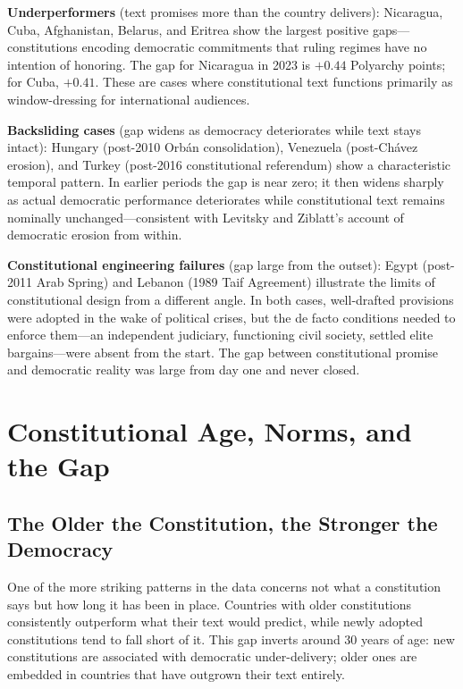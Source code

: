 \documentclass[9pt,twoside]{pnas-new}
\begin{document}
\textbf{Underperformers} (text promises more than the country delivers): Nicaragua, Cuba, Afghanistan, Belarus, and Eritrea show the largest positive gaps---constitutions encoding democratic commitments that ruling regimes have no intention of honoring. The gap for Nicaragua in 2023 is $+0.44$ Polyarchy points; for Cuba, $+0.41$. These are cases where constitutional text functions primarily as window-dressing for international audiences.

\textbf{Backsliding cases} (gap widens as democracy deteriorates while text stays intact): Hungary (post-2010 Orb\'an consolidation), Venezuela (post-Ch\'avez erosion), and Turkey (post-2016 constitutional referendum) show a characteristic temporal pattern. In earlier periods the gap is near zero; it then widens sharply as actual democratic performance deteriorates while constitutional text remains nominally unchanged---consistent with Levitsky and Ziblatt's \cite{levitsky_ziblatt_2018} account of democratic erosion from within.

\textbf{Constitutional engineering failures} (gap large from the outset): Egypt (post-2011 Arab Spring) and Lebanon (1989 Taif Agreement) illustrate the limits of constitutional design from a different angle. In both cases, well-drafted provisions were adopted in the wake of political crises, but the de facto conditions needed to enforce them---an independent judiciary, functioning civil society, settled elite bargains---were absent from the start. The gap between constitutional promise and democratic reality was large from day one and never closed.

\section*{Constitutional Age, Norms, and the Gap}

\subsection*{The Older the Constitution, the Stronger the Democracy}

One of the more striking patterns in the data concerns not what a constitution says but how long it has been in place. Countries with older constitutions consistently outperform what their text would predict, while newly adopted constitutions tend to fall short of it. This gap inverts around 30 years of age: new constitutions are associated with democratic under-delivery; older ones are embedded in countries that have outgrown their text entirely.
\end{document}
